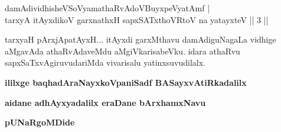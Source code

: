 \begin{shl}
damAdividhisheVSoV\s yamathaRvAdoV\s BuyxpeVyatAmf  | \\
 tarxyA itAyxdikoV garxnathxH sapxSATxthoVR\s toV na yatayxteV \hfill||  3 || 
\end{shl}

\begin{artha}
tarxyaH pArxjApatAyxH... itAyxdi garxMthavu damAdiguNagaLa vidhige aMgavAda athaRvAdaveMdu aMgiVkarisabeVku. idara athaRvu sapxSaTxvAgiruvudariMda vivarisalu yatinxsuvudilalx.
\end{artha}

\begin{center}
{\bf ililxge baqhadAraNayxkoVpaniSadf BASayxvAtiRkadalilx}
\smallskip

{\bf aidane adhAyxyadalilx eraDane bArxhamxNavu}
\smallskip

{\bf pUNaRgoMDide}
\end{center}

